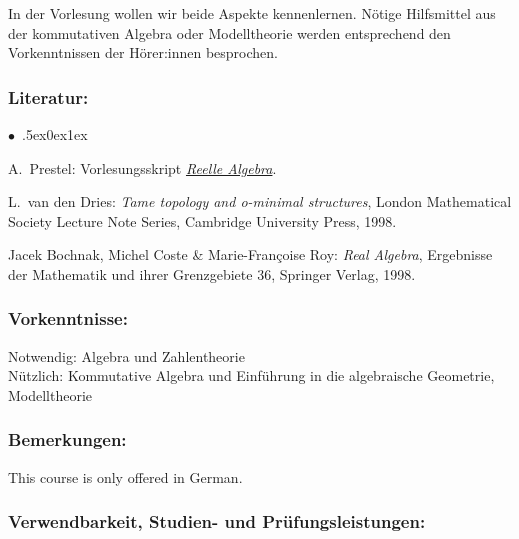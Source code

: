 \documentclass[a4paper,10pt]{article}
\renewenvironment{itemize}{\begin{list}{$\bullet$\ }{\itemsep.5ex\setlength{\topsep}{0.5\itemsep}\parsep0ex\labelsep1ex\settowidth{\labelwidth}{$\bullet$\ }\setlength{\leftmargin}{\labelwidth}\addtolength{\leftmargin}{3ex}\addtolength{\leftmargin}{\labelsep}}}{\end{list}}
\begin{document}
In der Vorlesung wollen wir beide Aspekte kennenlernen. Nötige Hilfsmittel aus der kommutativen Algebra oder Modelltheorie werden entsprechend den Vorkenntnissen der Hörer:innen besprochen. 
\subsubsection*{\large
    Literatur:
}
\begin{itemize}
\item A.~Prestel: Vorlesungsskript \href{http://www.math.uni-konstanz.de/\~prestel/raskript.pdf}{\emph{Reelle Algebra}}.
\item
L.~van den Dries: \emph{Tame topology and o-minimal structures}, London Mathematical Society Lecture Note Series, Cambridge University Press, 1998. 
\item
Jacek Bochnak, Michel Coste \& Marie-Françoise Roy: \emph{Real Algebra}, Ergebnisse der Mathematik und ihrer Grenzgebiete 36, Springer Verlag, 1998.
\end{itemize}
\subsubsection*{\large
    Vorkenntnisse:
}
Notwendig: Algebra und Zahlentheorie \\
Nützlich: Kommutative Algebra und Einführung in die algebraische Geometrie, Modelltheorie
\subsubsection*{\large
    Bemerkungen:
}
This course is only offered in German.
\cleardoublepage
\subsubsection*{\large
    Verwendbarkeit, Studien- und Prüfungsleistungen:
}
\end{document}
